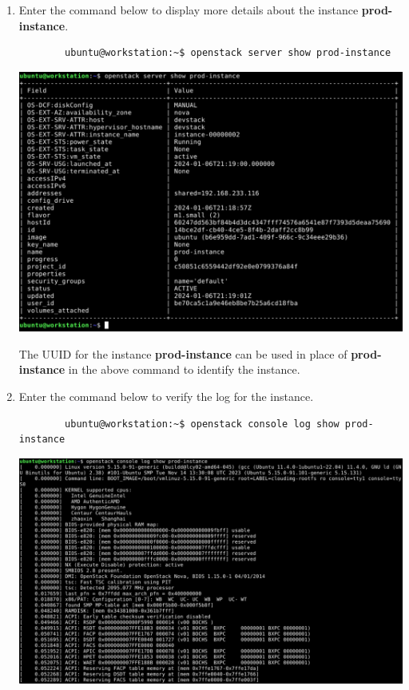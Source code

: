 \documentclass[letterpaper, 12pt]{article}
\begin{document}
\begin{enumerate}
    \item Enter the command below to display more details about the instance \textbf{prod-instance}.
    \begin{lstlisting}
        ubuntu@workstation:~$ openstack server show prod-instance
    \end{lstlisting}

    \begin{center}
        \includegraphics[width=\linewidth]{images/part2/step13.png}
    \end{center}

    \begin{tipbox}
        The UUID for the instance \textbf{prod-instance} can be used in place of \textbf{prod-instance} in the above
        command to identify the instance.
    \end{tipbox}

    \item Enter the command below to verify the log for the instance.
    \begin{lstlisting}
        ubuntu@workstation:~$ openstack console log show prod-instance
    \end{lstlisting}

    \begin{center}
        \includegraphics[width=\linewidth]{images/part2/step14.png}
    \end{center}


\end{enumerate}
\end{document}
